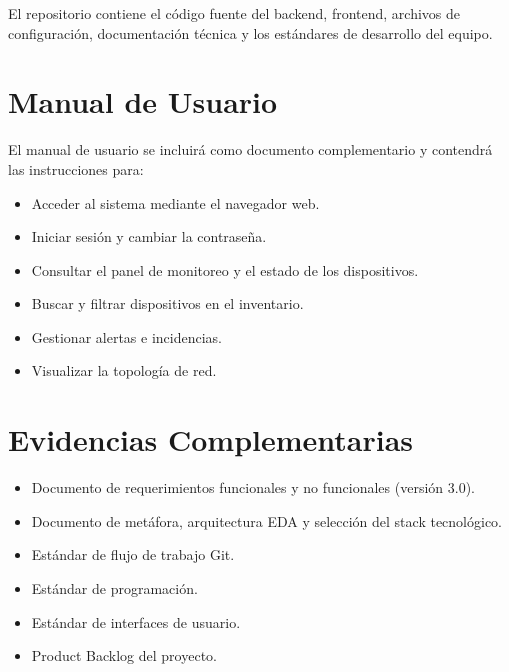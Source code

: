 \documentclass[12pt,a4paper]{report}
\begin{document}
El repositorio contiene el código fuente del backend, frontend, archivos de configuración, documentación técnica y los estándares de desarrollo del equipo.

\section{Manual de Usuario}

El manual de usuario se incluirá como documento complementario y contendrá las instrucciones para:

\begin{itemize}
  \item Acceder al sistema mediante el navegador web.
  \item Iniciar sesión y cambiar la contraseña.
  \item Consultar el panel de monitoreo y el estado de los dispositivos.
  \item Buscar y filtrar dispositivos en el inventario.
  \item Gestionar alertas e incidencias.
  \item Visualizar la topología de red.
\end{itemize}

\section{Evidencias Complementarias}

\begin{itemize}
  \item Documento de requerimientos funcionales y no funcionales (versión 3.0).
  \item Documento de metáfora, arquitectura EDA y selección del stack tecnológico.
  \item Estándar de flujo de trabajo Git.
  \item Estándar de programación.
  \item Estándar de interfaces de usuario.
  \item Product Backlog del proyecto.
\end{itemize}
\end{document}
